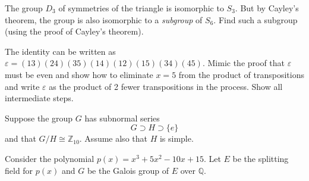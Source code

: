 \documentclass[12pt]{exam}
\def\Z{\mathbb Z}
\def\Q{\mathbb Q}
\begin{document}
\begin{questions}


  \question The group $D_3$ of symmetries of the triangle is isomorphic to $S_3$.  But by Cayley's theorem, the group is also isomorphic to a {\em subgroup} of $S_6$.  Find such a subgroup (using the proof of Cayley's theorem).
  
  \clearpage
  
  
  
  \question The identity can be written as $\varepsilon = (13)(24)(35)(14)(12)(15)(34)(45)$.
  Mimic the proof that $\varepsilon$ must be even and show how to eliminate $x = 5$ from the product of transpositions and write $\varepsilon$ as the product of 2 fewer transpositions in the process.  Show all intermediate steps.
  
  \clearpage
  
  
  
  
  \question Suppose the group $G$ has subnormal series 
  \[G \supset H \supset \{e\}\]
  and that $G/H \cong \Z_{10}$.  Assume also that $H$ is simple.
  
    \clearpage
  
  
  \question Consider the polynomial $p(x) = x^3 + 5x^2 - 10x + 15$.  Let $E$ be the splitting field for $p(x)$ and $G$ be the Galois group of $E$ over $\Q$.
  \begin{parts}

\end{parts}
\end{questions}
\end{document}
